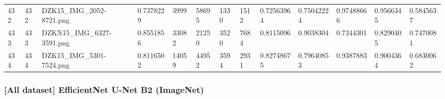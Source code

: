 \documentclass[11pt, a4paper, twoside]{report}
\begin{document}
\begin{longtable}[c]{@{}lllllllllllll@{}}
432 & 432 & DZK15\_IMG\_2052-8721.png & 0.7378229 & 3999 & 58695 & 1330 & 1512 & 0.72563964 & 0.75042224 & 0.97488666 & 0.9566345 & 0.5845637 \\
433 & 433 & DZKN15\_IMG\_6327-3591.png & 0.8551856 & 33082 & 21250 & 3520 & 7684 & 0.8115096 & 0.9038304 & 0.7344301 & 0.8290405 & 0.7470081 \\
434 & 434 & DZK15\_IMG\_5301-7524.png & 0.8116502 & 14059 & 44952 & 3594 & 2931 & 0.82748675 & 0.79640853 & 0.9387883 & 0.9004364 & 0.6830062 \\* \bottomrule
\end{longtable}

\newpage

\subsubsection{[All dataset] EfficientNet U-Net B2 (ImageNet)}
\end{document}
